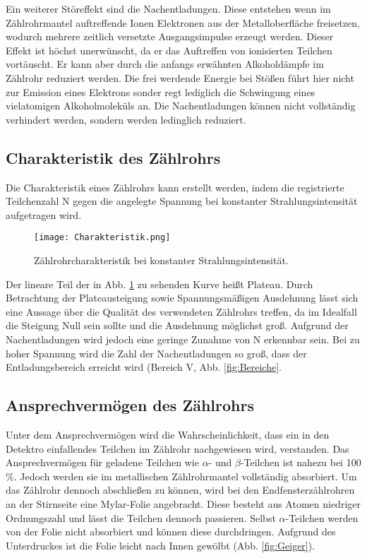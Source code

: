 Ein weiterer Störeffekt sind die Nachentladungen. Diese entstehen wenn im Zählrohrmantel
auftreffende Ionen Elektronen aus der Metalloberfläche freisetzen, wodurch mehrere
zeitlich versetzte Ausgangsimpulse erzeugt werden. Dieser Effekt ist höchst unerwünscht,
da er das Auftreffen von ionisierten Teilchen vortäuscht. Er kann aber durch die anfangs
erwähnten Alkoholdämpfe im Zählrohr reduziert werden. Die frei werdende Energie
bei Stößen führt hier nicht zur Emission eines Elektrons sonder regt lediglich
die Schwingung eines vielatomigen Alkoholmoleküls an. Die Nachentladungen
können nicht vollständig verhindert werden, sondern werden ledinglich reduziert.

\subsection{Charakteristik des Zählrohrs}

Die Charakteristik eines Zählrohrs kann erstellt werden, indem die registrierte Teilchenzahl
N gegen die angelegte Spannung bei konstanter Strahlungsintensität aufgetragen wird.

\begin{figure}
  \centering
  \texttt{[image: Charakteristik.png]}
  \caption{Zählrohrcharakteristik bei konstanter Strahlungsintensität. \cite{anleitung01}}
  \label{fig:Charakteristik1}
\end{figure}

Der lineare Teil der in Abb. \ref{fig:Charakteristik1} zu sehenden Kurve heißt
Plateau. Durch Betrachtung der Plateausteigung sowie Spannungsmäßigen Ausdehnung
lässt sich eine Aussage über die Qualität des verwendeten Zählrohrs treffen, da
im Idealfall die Steigung Null sein sollte und die Ausdehnung möglichst groß.
Aufgrund der Nachentladungen wird jedoch eine geringe Zunahme von N erkennbar sein.
Bei zu hoher Spannung wird die Zahl der Nachentladungen so groß, dass der Entladungsbereich
erreicht wird (Bereich V, Abb. \ref{fig:Bereiche}.

\subsection{Ansprechvermögen des Zählrohrs}

Unter dem Ansprechvermögen wird die Wahrscheinlichkeit, dass ein in den
Detektro einfallendes Teilchen im Zählrohr nachgewiesen wird, verstanden.
Das Ansprechvermögen für geladene Teilchen wie $\alpha$- und $\beta$-Teilchen ist
nahezu bei 100 \%. Jedoch werden sie im metallischen Zählrohrmantel vollständig
absorbiert. Um das Zählrohr dennoch abschließen zu können,
wird bei den Endfensterzählrohren an der Stirnseite eine Mylar-Folie angebracht.
Diese besteht aus Atomen niedriger Ordnungszahl und lässt die Teilchen dennoch passieren.
Selbst $\alpha$-Teilchen werden von der Folie nicht absorbiert und können
diese durchdringen.
Aufgrund des Unterdruckes ist die Folie leicht nach Innen gewölbt (Abb. \ref{fig:Geiger}).

